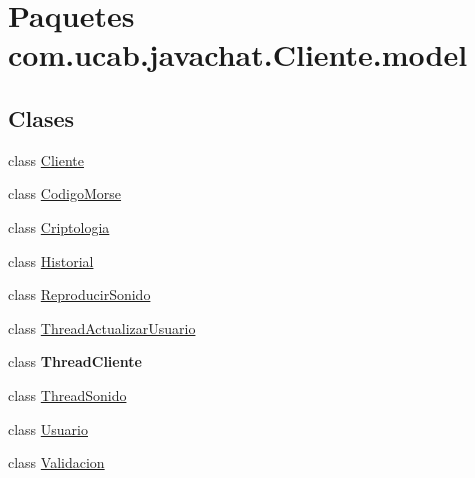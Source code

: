 \hypertarget{namespacecom_1_1ucab_1_1javachat_1_1_cliente_1_1model}{\section{Paquetes com.\-ucab.\-javachat.\-Cliente.\-model}
\label{namespacecom_1_1ucab_1_1javachat_1_1_cliente_1_1model}
}
\subsection*{Clases}
\begin{DoxyCompactItemize}
\item 
class \hyperlink{classcom_1_1ucab_1_1javachat_1_1_cliente_1_1model_1_1_cliente}{Cliente}
\item 
class \hyperlink{classcom_1_1ucab_1_1javachat_1_1_cliente_1_1model_1_1_codigo_morse}{Codigo\-Morse}
\item 
class \hyperlink{classcom_1_1ucab_1_1javachat_1_1_cliente_1_1model_1_1_criptologia}{Criptologia}
\item 
class \hyperlink{classcom_1_1ucab_1_1javachat_1_1_cliente_1_1model_1_1_historial}{Historial}
\item 
class \hyperlink{classcom_1_1ucab_1_1javachat_1_1_cliente_1_1model_1_1_reproducir_sonido}{Reproducir\-Sonido}
\item 
class \hyperlink{classcom_1_1ucab_1_1javachat_1_1_cliente_1_1model_1_1_thread_actualizar_usuario}{Thread\-Actualizar\-Usuario}
\item 
class {\bfseries Thread\-Cliente}
\item 
class \hyperlink{classcom_1_1ucab_1_1javachat_1_1_cliente_1_1model_1_1_thread_sonido}{Thread\-Sonido}
\item 
class \hyperlink{classcom_1_1ucab_1_1javachat_1_1_cliente_1_1model_1_1_usuario}{Usuario}
\item 
class \hyperlink{classcom_1_1ucab_1_1javachat_1_1_cliente_1_1model_1_1_validacion}{Validacion}
\end{DoxyCompactItemize}
